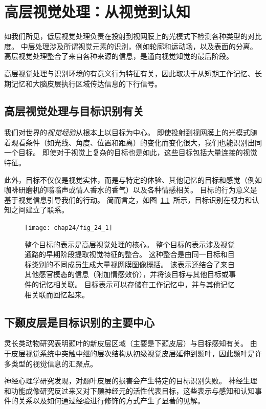 \chapter{高层视觉处理：从视觉到认知} \label{chap:chap24}

如我们所见，低层视觉处理负责在投射到视网膜上的光模式下检测各种类型的对比度。
中层处理涉及所谓视觉元素的识别，例如轮廓和运动场，以及表面的分离。
高层视觉处理整合了来自各种来源的信息，是通向视觉知觉的最后阶段。


高层视觉处理与识别环境的有意义行为特征有关，因此取决于从短期工作记忆、长期记忆和大脑皮层执行区域传达信息的下行信号。


\section{高层视觉处理与目标识别有关}

我们对世界的\textit{视觉经验}从根本上以目标为中心。
即使投射到视网膜上的光模式随着观看条件（如光线、角度、位置和距离）的变化而变化很大，我们也能识别出同一个目标。
即使对于视觉上复杂的目标也是如此，这些目标包括大量连接的视觉特征。


此外，目标不仅仅是视觉实体，而是与特定的体验、其他记忆的目标和感觉（例如咖啡研磨机的嗡嗡声或情人香水的香气）以及各种情感相关。
目标的行为意义是基于视觉信息引导我们的行动。
简而言之，如图~\ref{fig:24_1}~所示，目标识别在视力和认知之间建立了联系。


\begin{figure}[htbp]
	\centering
	\texttt{[image: chap24/fig\_24\_1]}
	\caption{整个目标的表示是高层视觉处理的核心。
		整个目标的表示涉及视觉通路的早期阶段提取视觉特征的整合。
		这种整合是由同一目标和目标类别的不同成员生成大量视网膜图像概括。
		该表示还结合了来自其他感官模态的信息（附加情感效价），并将该目标与其他目标或事件的记忆相关联。
		目标表示可以存储在工作记忆中，并与其他记忆相关联而回忆起来。}
	\label{fig:24_1}
\end{figure}



\section{下颞皮层是目标识别的主要中心}

灵长类动物研究表明颞叶的新皮层区域（主要是下颞皮层）与目标感知有关。
由于皮层视觉系统中突触中继的层次结构从初级视觉皮层延伸到颞叶，因此颞叶是许多类型的视觉信息的汇聚点。


神经心理学研究发现，对颞叶皮层的损害会产生特定的目标识别失败。
神经生理和功能成像研究反过来又对下颞神经元的活性代表目标，这些表示与感知和认知事件的关系以及如何通过经验进行修饰的方式产生了显著的见解。


